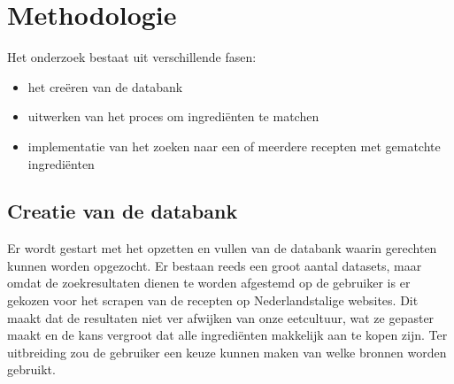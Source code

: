 \documentclass{hogent-article}
\begin{document}

\section{Methodologie}%
\label{sec:methodologie}


Het onderzoek bestaat uit verschillende fasen:
\begin{itemize}
    \item het creëren van de databank
    \item uitwerken van het proces om ingrediënten te matchen
    \item implementatie van het zoeken naar een of meerdere recepten met gematchte ingrediënten
\end{itemize}

\subsection{Creatie van de databank}%

Er wordt gestart met het opzetten en vullen van de databank waarin gerechten kunnen worden opgezocht. Er bestaan reeds een groot aantal datasets, maar omdat de zoekresultaten dienen te worden afgestemd op de gebruiker is er gekozen voor het scrapen van de recepten op Nederlandstalige websites. Dit maakt dat de resultaten niet ver afwijken van onze eetcultuur, wat ze gepaster maakt en de kans vergroot dat alle ingrediënten makkelijk aan te kopen zijn. Ter  uitbreiding zou de gebruiker een keuze kunnen maken van welke bronnen worden gebruikt.
\end{document}
